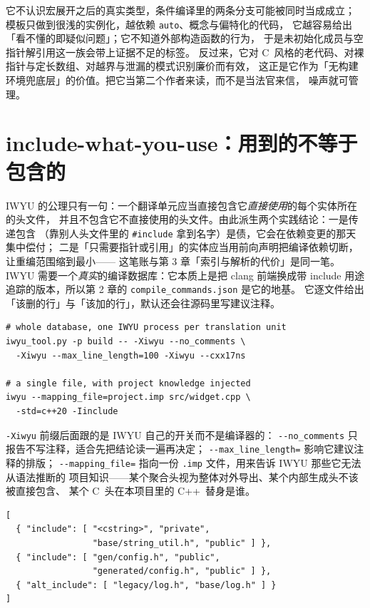 \documentclass[12pt,a4paper,fontset=fandol]{ctexbook}
\newcommand{\Tp}[1]{\texttt{#1}}
\newcommand{\Opt}[1]{\texttt{-\/-#1}}
\newcommand{\Lang}[1]{\textsf{#1}}
\newcommand{\CL}{\Lang{C}}
\newcommand{\CPP}{\Lang{C++}}
\begin{document}
\begin{note}[title={cppcheck 的误报是有形状的}]
它不认识宏展开之后的真实类型，条件编译里的两条分支可能被同时当成成立；
模板只做到很浅的实例化，越依赖 \Tp{auto}、概念与偏特化的代码，
它越容易给出「看不懂的即疑似问题」；它不知道外部构造函数的行为，
于是未初始化成员与空指针解引用这一族会带上证据不足的标签。
反过来，它对 \CL\ 风格的老代码、对裸指针与定长数组、对越界与泄漏的模式识别廉价而有效，
这正是它作为「无构建环境兜底层」的价值。把它当第二个作者来读，而不是当法官来信，
噪声就可管理。
\end{note}

\section{include-what-you-use：用到的不等于包含的}\label{sec:ch15-s3}

IWYU 的公理只有一句：一个翻译单元应当直接包含它\emph{直接使用}的每个实体所在的头文件，
并且不包含它不直接使用的头文件。由此派生两个实践结论：一是传递包含
（靠别人头文件里的 \texttt{\#include} 拿到名字）是债，它会在依赖变更的那天集中偿付；
二是「只需要指针或引用」的实体应当用前向声明把编译依赖切断，让重编范围缩到最小——
这笔账与第 3 章「索引与解析的代价」是同一笔。
IWYU 需要一个\emph{真实}的编译数据库：它本质上是把 clang 前端换成带 include
用途追踪的版本，所以第 2 章的 \texttt{compile\_commands.json} 是它的地基。
它逐文件给出「该删的行」与「该加的行」，默认还会往源码里写建议注释。

\begin{lstlisting}[style=shellstyle,caption={IWYU 的并行跑法与单文件调试},label={lst:ch15-iwyu}]
# whole database, one IWYU process per translation unit
iwyu_tool.py -p build -- -Xiwyu --no_comments \
  -Xiwyu --max_line_length=100 -Xiwyu --cxx17ns

# a single file, with project knowledge injected
iwyu --mapping_file=project.imp src/widget.cpp \
  -std=c++20 -Iinclude
\end{lstlisting}

\texttt{-Xiwyu} 前缀后面跟的是 IWYU 自己的开关而不是编译器的：
\Opt{no\_comments} 只报告不写注释，适合先把结论读一遍再决定；
\Opt{max\_line\_length=} 影响它建议注释的排版；
\Opt{mapping\_file=} 指向一份 \texttt{.imp} 文件，用来告诉 IWYU 那些它无法从语法推断的
项目知识——某个聚合头视为整体对外导出、某个内部生成头不该被直接包含、
某个 \CL\ 头在本项目里的 \CPP\ 替身是谁。

\begin{lstlisting}[style=jsonstyle,caption={.imp 映射文件的大致形态：把约定写成数据},label={lst:ch15-imp}]
[
  { "include": [ "<cstring>", "private",
                 "base/string_util.h", "public" ] },
  { "include": [ "gen/config.h", "public",
                 "generated/config.h", "public" ] },
  { "alt_include": [ "legacy/log.h", "base/log.h" ] }
]
\end{lstlisting}
\end{document}

